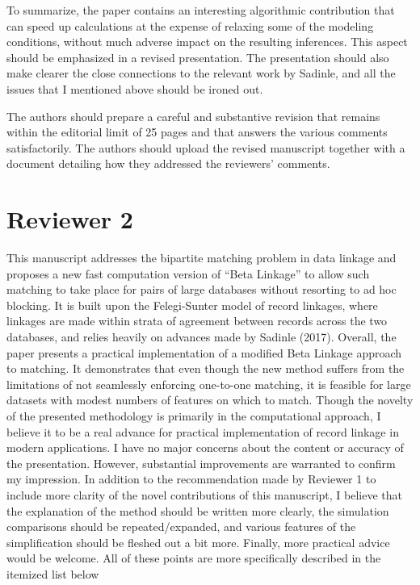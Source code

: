 \documentclass[letterpaper, parskip]{scrartcl}
\newcounter{responsectr}[section]     %
\newcommand{\reply}[2]{%
	\refstepcounter{responsectr}%
	\textbf{#1.\theresponsectr:} #2
}
\begin{document}
	To summarize, the paper contains an interesting algorithmic contribution that can speed up calculations at the expense of relaxing some of the modeling conditions, without much adverse impact on the resulting inferences.  This aspect should be emphasized in a revised presentation.  The presentation should also make clearer the close connections to the relevant work by Sadinle, and all the issues that I mentioned above should be ironed out.
	
	The authors should prepare a careful and substantive revision that remains within the editorial limit of 25 pages and that answers the various comments satisfactorily.  The authors should upload the revised manuscript together with a document detailing how they addressed the reviewers’ comments.
	

	

	
	\clearpage
	\newpage
	
	\section*{Reviewer 2}
	\setcounter{responsectr}{0}
	This manuscript addresses the bipartite matching problem in data linkage and proposes a new fast
	computation version of “Beta Linkage” to allow such matching to take place for pairs of large databases
	without resorting to ad hoc blocking. It is built upon the Felegi-Sunter model of record linkages, where
	linkages are made within strata of agreement between records across the two databases, and relies
	heavily on advances made by Sadinle (2017).
	Overall, the paper presents a practical implementation of a modified Beta Linkage approach to
	matching. It demonstrates that even though the new method suffers from the limitations of not
	seamlessly enforcing one-to-one matching, it is feasible for large datasets with modest numbers of
	features on which to match. Though the novelty of the presented methodology is primarily in the
	computational approach, I believe it to be a real advance for practical implementation of record linkage
	in modern applications.
	I have no major concerns about the content or accuracy of the presentation. However, substantial
	improvements are warranted to confirm my impression. In addition to the recommendation made by
	Reviewer 1 to include more clarity of the novel contributions of this manuscript, I believe that the
	explanation of the method should be written more clearly, the simulation comparisons should be
	repeated/expanded, and various features of the simplification should be fleshed out a bit more. Finally,
	more practical advice would be welcome. All of these points are more specifically described in the
	itemized list below
	
\end{document}

